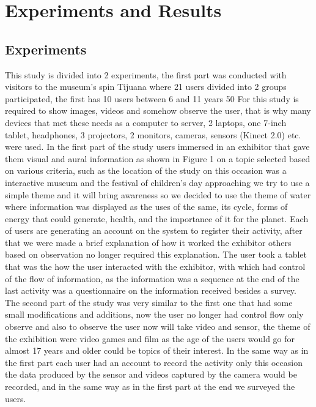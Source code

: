 \chapter{Experiments and Results} \label{expres} 
\section{Experiments}
This study is divided into 2 experiments, the ﬁrst part was conducted with visitors to the museum’s spin Tijuana where 21 users divided into 2 groups participated, the ﬁrst has 10 users between 6 and 11 years 50%
For this study is required to show images, videos and somehow observe the user, that is why many devices that met these needs as a computer to server, 2 laptops, one 7-inch tablet, headphones, 3 projectors, 2 monitors, cameras, sensors (Kinect 2.0) etc. were used. 
In the ﬁrst part of the study users immersed in an exhibitor that gave them visual and aural information as shown in Figure 1 on a topic selected based on various criteria, such as the location of the study on this occasion was a interactive museum and the festival of children’s day approaching we try to use a simple theme and it will bring awareness so we decided to use the theme of water where information was displayed as the uses of the same, its cycle, forms of energy that could generate, health, and the importance of it for the planet. Each of users are generating an account on the system to register their activity, after that we were made a brief explanation of how it worked the exhibitor others based on observation no longer required this explanation. The user took a tablet that was the how the user interacted with the exhibitor, with which had control of the ﬂow of information, as the information was a sequence at the end of the last activity was a questionnaire on the information received besides a survey.
The second part of the study was very similar to the ﬁrst one that had some small modiﬁcations and additions, now the user no longer had control ﬂow only observe and also to observe the user now will take video and sensor, the theme of the exhibition were video games and ﬁlm as the age of the users would go for almost 17 years and older could be topics of their interest. In the same way as in the ﬁrst part each user had an account to record the activity only this occasion the data produced by the sensor and videos captured by the camera would be recorded, and in the same way as in the ﬁrst part at the end we surveyed the users.
